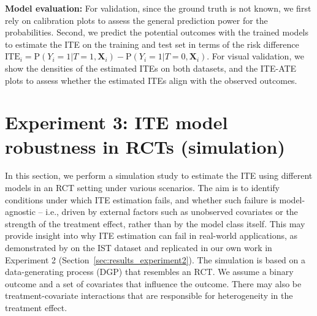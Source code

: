 \medskip

\textbf{Model evaluation: } For validation, since the ground truth is not known, we first rely on calibration plots to assess the general prediction power for the probabilities. Second, we predict the potential outcomes with the trained models to estimate the ITE on the training and test set in terms of the risk difference $\text{ITE}_i = \text{P}(Y_i=1|T=1, \mathbf{X}_i) - \text{P}(Y_i=1|T=0, \mathbf{X}_i)$. For visual validation, we show the densities of the estimated ITEs on both datasets, and the ITE-ATE plots to assess whether the estimated ITEs align with the observed outcomes.
















\section{Experiment 3: ITE model robustness in RCTs (simulation)} \label{sec:methods_experiment3}

In this section, we perform a simulation study to estimate the ITE using different models in an RCT setting under various scenarios. The aim is to identify conditions under which ITE estimation fails, and whether such failure is model-agnostic -- i.e., driven by external factors such as unobserved covariates or the strength of the treatment effect, rather than by the model class itself. This may provide insight into why ITE estimation can fail in real-world applications, as demonstrated by \citet{chen2025} on the IST dataset and replicated in our own work in Experiment 2 (Section~\ref{sec:results_experiment2}). The simulation is based on a data-generating process (DGP) that resembles an RCT. We assume a binary outcome and a set of covariates that influence the outcome. There may also be treatment-covariate interactions that are responsible for heterogeneity in the treatment effect.

\medskip


